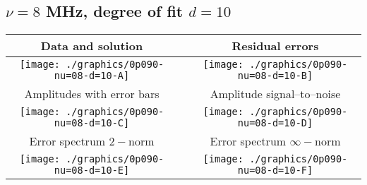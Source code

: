 

% 

\clearpage{}
\break{}

\subsection{$\nu = 8$ MHz, degree of fit $d = 10$}

\begin{table}[h]
    \begin{center}
        \begin{tabular}{ccc}
            Data and solution & \quad & Residual errors \\\hline
            \texttt{[image: ./graphics/0p090-nu=08-d=10-A]} &&
            \texttt{[image: ./graphics/0p090-nu=08-d=10-B]} \\[15pt]
            Amplitudes with error bars && Amplitude signal--to--noise \\\hline
            \texttt{[image: ./graphics/0p090-nu=08-d=10-C]} &&
            \texttt{[image: ./graphics/0p090-nu=08-d=10-D]} \\[15pt]
            Error spectrum $2-$norm && Error spectrum $\infty-$norm \\\hline
            \texttt{[image: ./graphics/0p090-nu=08-d=10-E]} &&
            \texttt{[image: ./graphics/0p090-nu=08-d=10-F]} \\[15pt]
        \end{tabular}
    \end{center}
\label{fig:elev=90, nu=8}
\end{table}



\endinput
